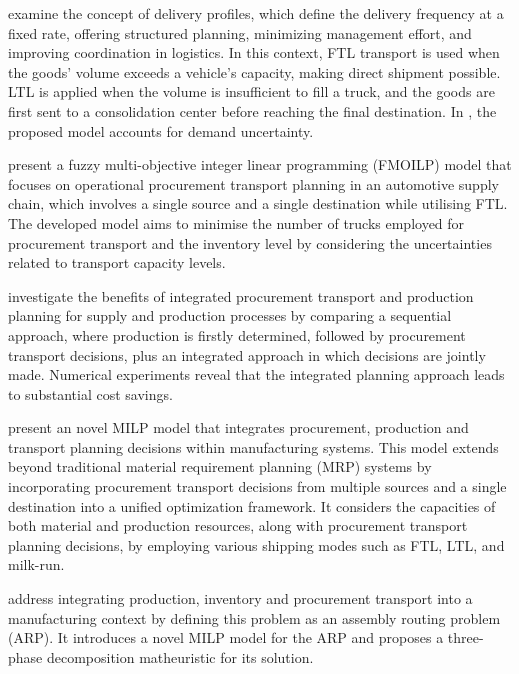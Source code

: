 \autocite{Schoneberg2010AnNetworks} examine the concept of delivery profiles, which define the delivery frequency at a fixed rate, offering structured planning, minimizing management effort, and improving coordination in logistics. In this context, FTL transport is used when the goods' volume exceeds a vehicle's capacity, making direct shipment possible. LTL is applied when the volume is insufficient to fill a truck, and the goods are first sent to a consolidation center before reaching the final destination. In \autocite{Schoneberg2013ANetworks}, the proposed model accounts for demand uncertainty.

\autocite{Diaz-Madronero2014APlanning} present a  fuzzy  multi-objective  integer  linear programming (FMOILP) model that focuses on operational procurement transport planning in an automotive supply chain, which involves a single source and a single destination while utilising FTL. The developed model aims to minimise the number of trucks employed for procurement transport and the inventory level by considering the uncertainties related to transport capacity levels.

\autocite{Hein2016QuantitativeProblem} investigate the benefits of integrated procurement transport and production planning for supply and production processes by comparing a sequential approach, where production is firstly determined, followed by procurement transport decisions, plus an integrated approach in which decisions are jointly made. Numerical experiments reveal that the integrated planning approach leads to substantial cost savings.

\autocite{Diaz-Madronero2017ADecisions} present an novel MILP model that integrates  procurement, production and transport planning decisions within manufacturing systems. This model extends beyond traditional material requirement planning (MRP) systems by incorporating procurement transport decisions from multiple sources and a single destination into a unified optimization framework. It considers the capacities of both material and production resources, along with procurement transport planning decisions, by employing various shipping modes such as FTL, LTL, and milk-run.

\autocite{Chitsaz2019ARouting} address integrating production, inventory and procurement transport into a manufacturing context by defining this problem as an assembly routing problem (ARP). It introduces a novel MILP model for the ARP and proposes a three-phase decomposition matheuristic for its solution.

